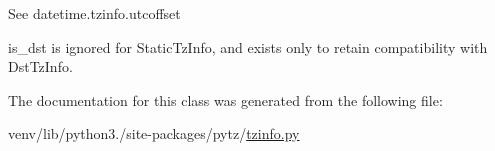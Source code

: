 \begin{DoxyVerb}See datetime.tzinfo.utcoffset

is_dst is ignored for StaticTzInfo, and exists only to
retain compatibility with DstTzInfo.
\end{DoxyVerb}
 

The documentation for this class was generated from the following file\+:\begin{DoxyCompactItemize}
\item 
venv/lib/python3./site-\/packages/pytz/\hyperlink{tzinfo_8py}{tzinfo.\+py}\end{DoxyCompactItemize}

